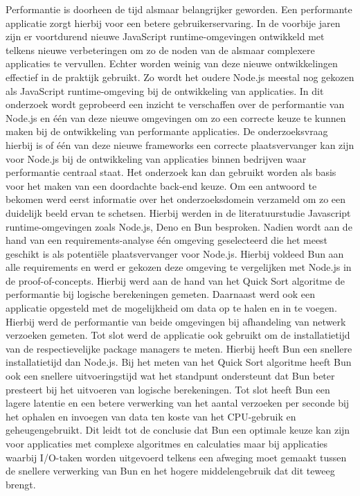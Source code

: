 Performantie is doorheen de tijd alsmaar belangrijker geworden. 
Een performante applicatie zorgt hierbij voor een betere gebruikerservaring.
In de voorbije jaren zijn er voortdurend nieuwe JavaScript runtime-omgevingen ontwikkeld met telkens nieuwe verbeteringen om
 zo de noden van de alsmaar complexere applicaties te vervullen. 
Echter worden weinig van deze nieuwe ontwikkelingen effectief in de praktijk gebruikt.
Zo wordt het oudere Node.js meestal nog gekozen als JavaScript runtime-omgeving bij de ontwikkeling van applicaties.
In dit onderzoek wordt geprobeerd een inzicht te verschaffen over de performantie van Node.js en één van deze nieuwe omgevingen
om zo een correcte keuze te kunnen maken bij de ontwikkeling van performante applicaties.
De onderzoeksvraag hierbij is of één van deze nieuwe frameworks  
een correcte plaatsvervanger kan zijn voor Node.js bij de ontwikkeling van applicaties binnen bedrijven 
waar performantie centraal staat. Het onderzoek kan dan gebruikt worden als basis 
voor het maken van een doordachte back-end keuze.
Om een antwoord te bekomen werd eerst informatie over het onderzoeksdomein verzameld om zo een duidelijk beeld ervan te schetsen.
Hierbij werden in de literatuurstudie Javascript runtime-omgevingen zoals Node.js, Deno en Bun besproken.
Nadien wordt aan de hand van een requirements-analyse één omgeving geselecteerd die het meest geschikt is als potentiële plaatsvervanger voor Node.js.
Hierbij voldeed Bun aan alle requirements en werd er gekozen deze omgeving te vergelijken met Node.js in de proof-of-concepts.
Hierbij werd aan de hand van het Quick Sort algoritme de performantie bij logische berekeningen gemeten.
Daarnaast werd ook een applicatie opgesteld met de mogelijkheid om data op te halen en in te voegen. 
Hierbij werd de performantie van beide omgevingen bij afhandeling van netwerk verzoeken gemeten.
Tot slot werd de applicatie ook gebruikt om de installatietijd van de respectievelijke package managers te meten.
Hierbij heeft Bun een snellere installatietijd dan Node.js.
Bij het meten van het Quick Sort algoritme heeft Bun ook een snellere uitvoeringstijd wat het standpunt ondersteunt dat Bun beter presteert bij het uitvoeren van logische berekeningen.
Tot slot heeft Bun een lagere latentie en een betere verwerking van het aantal verzoeken per seconde bij het ophalen en invoegen van data ten koste van het CPU-gebruik en geheugengebruikt.
Dit leidt tot de conclusie dat Bun een optimale keuze kan zijn voor applicaties met complexe algoritmes en calculaties maar 
bij applicaties waarbij I/O-taken worden uitgevoerd telkens een afweging moet gemaakt tussen de snellere verwerking van Bun en het hogere middelengebruik dat dit teweeg brengt.


